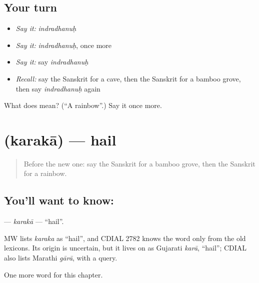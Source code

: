 \subsection*{Your turn}
\begin{itemize}
\raggedright
  \item \emph{Say it:} \emph{indradhanuḥ}
  \item \emph{Say it:} \emph{indradhanuḥ}, once more
  \item \emph{Say it:} say \emph{indradhanuḥ}
  \item \emph{Recall:} say the Sanskrit for a cave, then the Sanskrit for a bamboo grove, then say \emph{indradhanuḥ} again
\end{itemize}

\begin{tcolorbox}[breakable,colback=teal!4,colframe=teal!35!black,title={Before you move on}]
What does  mean? (\textquotedblleft{}A rainbow\textquotedblright{}.) Say it once more.
\end{tcolorbox}
\section[\texorpdfstring{\sk{करका} (karakā)}{करका (karakā)}]{ (karakā) — hail}

\label{lesson:SA-C197-karaka}



\begin{quote}
Before the new one: say the Sanskrit for a bamboo grove, then the Sanskrit for a rainbow.
\end{quote}

\subsection*{You'll want to know: }
\textbf{} — \emph{karakā} — \textquotedblleft{}hail\textquotedblright{}.

\begin{cousinweb}
MW lists \emph{karaka} as \textquotedblleft{}hail\textquotedblright{}, and CDIAL 2782 knows the word only from the old lexicons. Its origin is uncertain, but it lives on as Gujarati \emph{karā}, \textquotedblleft{}hail\textquotedblright{}; CDIAL also lists Marathi \emph{gārā}, with a query.
\end{cousinweb}

\begin{grammarlens}[title={What you've built}]
One more word for this chapter.
\end{grammarlens}

